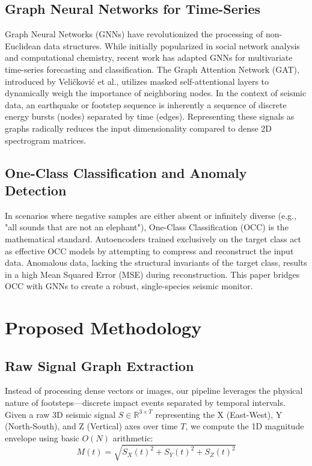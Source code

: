 \documentclass[conference, a4paper]{IEEEtran}
\begin{document}
\subsection{Graph Neural Networks for Time-Series}
Graph Neural Networks (GNNs) have revolutionized the processing of non-Euclidean data structures. While initially popularized in social network analysis and computational chemistry, recent work has adapted GNNs for multivariate time-series forecasting and classification. The Graph Attention Network (GAT), introduced by Veli\v{c}kovi\'{c} et al., utilizes masked self-attentional layers to dynamically weigh the importance of neighboring nodes. In the context of seismic data, an earthquake or footstep sequence is inherently a sequence of discrete energy bursts (nodes) separated by time (edges). Representing these signals as graphs radically reduces the input dimensionality compared to dense 2D spectrogram matrices.

\subsection{One-Class Classification and Anomaly Detection}
In scenarios where negative samples are either absent or infinitely diverse (e.g., "all sounds that are not an elephant"), One-Class Classification (OCC) is the mathematical standard. Autoencoders trained exclusively on the target class act as effective OCC models by attempting to compress and reconstruct the input data. Anomalous data, lacking the structural invariants of the target class, results in a high Mean Squared Error (MSE) during reconstruction. This paper bridges OCC with GNNs to create a robust, single-species seismic monitor.

\section{Proposed Methodology}

\subsection{Raw Signal Graph Extraction}
Instead of processing dense vectors or images, our pipeline leverages the physical nature of footsteps—discrete impact events separated by temporal intervals. Given a raw 3D seismic signal $S \in \mathbb{R}^{3 \times T}$ representing the X (East-West), Y (North-South), and Z (Vertical) axes over time $T$, we compute the 1D magnitude envelope using basic $O(N)$ arithmetic:
\begin{equation}
    M(t) = \sqrt{S_X(t)^2 + S_Y(t)^2 + S_Z(t)^2}
\end{equation}
\end{document}
